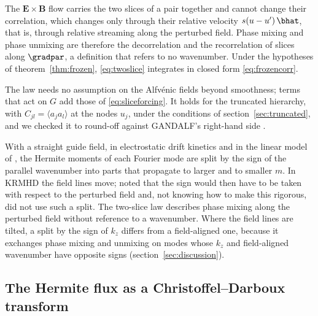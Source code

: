 The $\boldsymbol E\times\boldsymbol B$ flow carries the two slices of a pair together and cannot change their correlation, which changes only through their relative velocity $s(u-u')\,\bhat$, that is, through relative streaming along the perturbed field. Phase mixing and phase unmixing are therefore the decorrelation and the recorrelation of slices along $\gradpar$, a definition that refers to no wavenumber. Under the hypotheses of theorem~\ref{thm:frozen}, \eqref{eq:twoslice} integrates in closed form \eqref{eq:frozencorr}.

The law needs no assumption on the Alfv\'enic fields beyond smoothness; terms that act on $G$ add those of \eqref{eq:sliceforcing}. It holds for the truncated hierarchy, with $C_{jl}=\langle a_ja_l\rangle$ at the nodes $u_j$, under the conditions of section~\ref{sec:truncated}, and we checked it to round-off against GANDALF's right-hand side \citep{Kanekar2025}.

With a straight guide field, in electrostatic drift kinetics \citep{Schekochihin2016,Parker2016} and in the linear model of \citet{Kanekar2015}, the Hermite moments of each Fourier mode are split by the sign of the parallel wavenumber into parts that propagate to larger and to smaller $m$. In KRMHD the field lines move; \citet{Meyrand2019} noted that the sign would then have to be taken with respect to the perturbed field and, not knowing how to make this rigorous, did not use such a split. The two-slice law describes phase mixing along the perturbed field without reference to a wavenumber. Where the field lines are tilted, a split by the sign of $k_z$ differs from a field-aligned one, because it exchanges phase mixing and unmixing on modes whose $k_z$ and field-aligned wavenumber have opposite signs (section~\ref{sec:discussion}).

\subsection{The Hermite flux as a Christoffel--Darboux transform}\label{dec:sec-flux}

